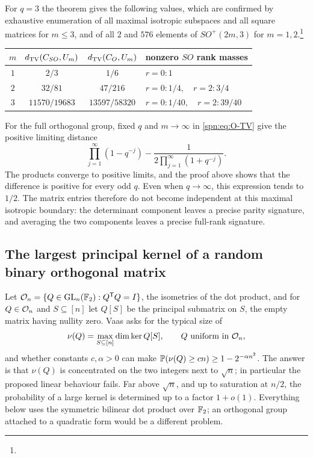 \begin{example}\label{spn:ex:orthogonal-q3}
For $q=3$ the theorem gives the following values, which are confirmed by
exhaustive enumeration of all maximal isotropic subspaces and all square
matrices for $m\le3$, and of all $2$ and $576$ elements of $SO^+(2m,3)$ for
$m=1,2$.\footnote{}
\begin{center}
\begin{tabular}{c|c|c|l}
 $m$ & $d_{\mathrm{TV}}(C_{SO},U_m)$ & $d_{\mathrm{TV}}(C_{O},U_m)$ & nonzero $SO$ rank masses\\\hline
 $1$ & $2/3$ & $1/6$ & $r=0\colon 1$\\
 $2$ & $32/81$ & $47/216$ & $r=0\colon 1/4,\quad r=2\colon 3/4$\\
 $3$ & $11570/19683$ & $13597/58320$ & $r=0\colon 1/40,\quad r=2\colon 39/40$
\end{tabular}
\end{center}
\end{example}

For the full orthogonal group, fixed $q$ and $m\to\infty$ in
\eqref{spn:eq:O-TV} give the positive limiting distance
\[
 \prod_{j=1}^{\infty}(1-q^{-j})-\frac{1}{2\prod_{j=1}^{\infty}(1+q^{-j})} .
\]
The products converge to positive limits, and the proof above shows that the
difference is positive for every odd $q$. Even when $q\to\infty$, this
expression tends to $1/2$. The matrix entries therefore do not become
independent at this maximal isotropic boundary: the determinant component
leaves a precise parity signature, and averaging the two components leaves a
precise full-rank signature.


\subsection{The largest principal kernel of a random binary orthogonal matrix}\label{spn:sec:binary}

Let $\mathcal{O}_n=\{Q\in\operatorname{GL}_n(\mathbb{F}_2):Q^{\mathsf{T}}Q=I\}$, the isometries of the dot product, and
for $Q\in\mathcal{O}_n$ and $S\subseteq[n]$ let $Q[S]$ be the principal submatrix on $S$, the empty
matrix having nullity zero. Vaas \cite{Vaas2026Principal} asks for the typical size of
\[
 \nu(Q)=\max_{S\subseteq[n]}\dim\ker Q[S],\qquad
 Q\text{ uniform in }\mathcal{O}_n ,
\]
and whether constants $c,\alpha>0$ can make
$\mathbb{P}(\nu(Q)\ge cn)\ge1-2^{-\alpha n^2}$. The answer is that $\nu(Q)$ is concentrated on the
two integers next to $\sqrt n$; in particular the proposed linear behaviour fails. Far above
$\sqrt n$, and up to saturation at $n/2$, the probability of a large kernel is determined up to a
factor $1+o(1)$. Everything
below uses the symmetric bilinear dot product over $\mathbb{F}_2$; an orthogonal group attached to a
quadratic form would be a different problem.

